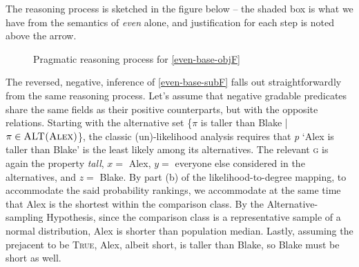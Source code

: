 \documentclass[12pt,letterpaper]{scrartcl}
\begin{document}
The reasoning process is sketched in the figure below -- the shaded box is what we have from the semantics of \textit{even} alone, and justification for each step is noted above the arrow.

\begin{figure}[h]
  \vspace{0.25cm}
  \begin{center}
     \end{center}
     \caption{Pragmatic reasoning process for \ref{even-base-objF}}
\end{figure}

The reversed, negative, inference of \ref{even-base-subF} falls out straightforwardly from the same reasoning process. Let's assume that negative gradable predicates share the same fields as their positive counterparts, but with the opposite relations. Starting with the alternative set \{$\pi$ is taller than Blake | $\pi \in \textsc{ALT(Alex)}$\}, the classic (un)-likelihood analysis requires that \textit{p} `Alex is taller than Blake' is the least likely among its alternatives. The relevant \textsc{g} is again the property \textit{tall}, $x =$ Alex, $y =$ everyone else considered in the alternatives, and $z =$ Blake. By part (b) of the likelihood-to-degree mapping, to accommodate the said probability rankings, we accommodate at the same time that Alex is the shortest within the comparison class. By the Alternative-sampling Hypothesis, since the comparison class is a representative sample of a normal distribution, Alex is shorter than population median. Lastly, assuming the prejacent to be \textsc{True}, Alex, albeit short, is taller than Blake, so Blake must be short as well. 
\end{document}
